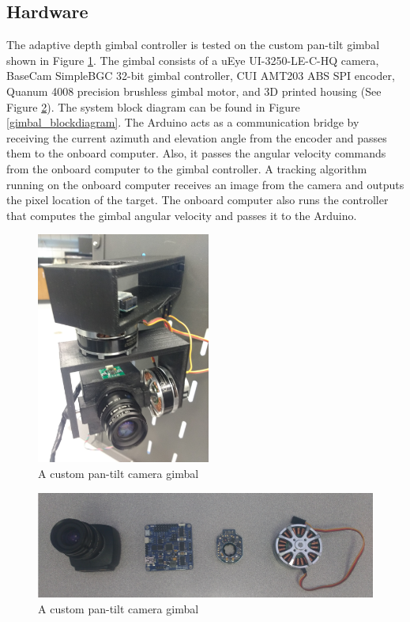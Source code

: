 \subsection{Hardware}
The adaptive depth gimbal controller is tested on the custom pan-tilt gimbal shown in Figure \ref{gimbal}. The gimbal consists of a uEye UI-3250-LE-C-HQ camera, BaseCam SimpleBGC 32-bit gimbal controller, CUI AMT203 ABS SPI encoder, Quanum 4008 precision brushless gimbal motor, and 3D printed housing (See Figure \ref{gimbal_parts}). The system block diagram can be found in Figure \ref{gimbal_blockdiagram}. The Arduino acts as a communication bridge by receiving the current azimuth and elevation angle from the encoder and passes them to the onboard computer. Also, it passes the angular velocity commands from the onboard computer to the gimbal controller. A tracking algorithm running on the onboard computer receives an image from the camera and outputs the pixel location of the target. The onboard computer also runs the controller that computes the gimbal angular velocity and passes it to the Arduino.
\begin{figure}[htbp]
	\centering
	\includegraphics[height = 3in]{images/chapter2/gimbal.jpg}
	\caption{A custom pan-tilt camera gimbal}
	\label{gimbal}
\end{figure}
\begin{figure}[htbp]
	\centering
	\includegraphics[width=0.8\linewidth]{images/chapter2/gimbal_parts.png}
	\caption{A custom pan-tilt camera gimbal}
	\label{gimbal_parts}
\end{figure}
